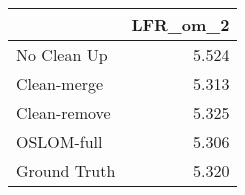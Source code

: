 \begin{tabular}{lr}
\toprule
{} & LFR_om_2 \\
\midrule
No Clean Up  &    5.524 \\
Clean-merge  &    5.313 \\
Clean-remove &    5.325 \\
OSLOM-full   &    5.306 \\
Ground Truth &    5.320 \\
\bottomrule
\end{tabular}
